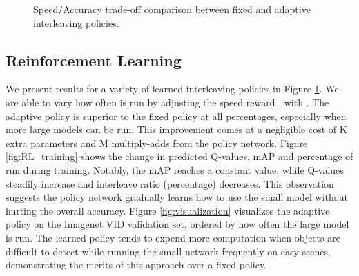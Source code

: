 \documentclass[10pt,twocolumn,letterpaper]{article}
\begin{document}
\begin{figure}[t]
\centering
{}
\centering
\vspace{-.5em}
\caption{Speed/Accuracy trade-off comparison between fixed and adaptive interleaving policies.}
\label{fig:rlgraph}
\end{figure}

\subsection{Reinforcement Learning}
\label{sec:4.3}
We present results for a variety of learned interleaving policies in Figure \ref{fig:rlgraph}. We are able to vary how often  is run by adjusting the speed reward , with . The adaptive policy is superior to the fixed policy at all percentages, especially when more large models can be run. This improvement comes at a negligible cost of K extra parameters and M multiply-adds from the policy network. Figure \ref{fig:RL_training} shows the change in predicted Q-values, mAP and percentage of  run during training. Notably, the mAP reaches a constant value, while Q-values steadily increase and interleave ratio (percentage) decreases. This observation suggests the policy network gradually learns how to use the small model without hurting the overall accuracy. Figure \ref{fig:visualization} visualizes the adaptive policy on the Imagenet VID validation set, ordered by how often the large model is run. The learned policy tends to expend more computation when objects are difficult to detect while running the small network frequently on easy scenes, demonstrating the merits of this approach over a fixed policy.
\end{document}

